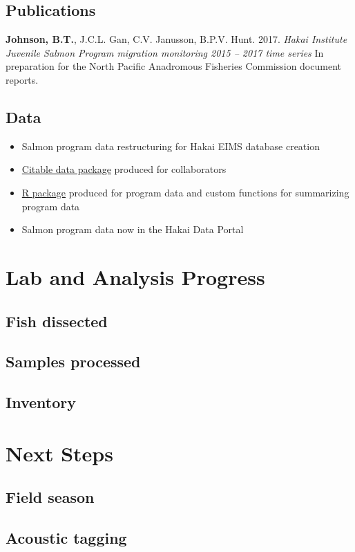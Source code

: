 \documentclass[12pt,]{article}
\providecommand{\tightlist}{%
  \setlength{\itemsep}{0pt}\setlength{\parskip}{0pt}}
\begin{document}
\subsection{Publications}\label{publications}

\textbf{Johnson, B.T.}, J.C.L. Gan, C.V. Janusson, B.P.V. Hunt. 2017.
\emph{Hakai Institute Juvenile Salmon Program migration monitoring 2015
-- 2017 time series} In preparation for the North Pacific Anadromous
Fisheries Commission document reports.

\subsection{Data}\label{data}

\begin{itemize}
\tightlist
\item
  Salmon program data restructuring for Hakai EIMS database creation
\item
  \href{http://dx.doi.org/10.21966/1.566666}{Citable data package}
  produced for collaborators
\item
  \href{https://github.com/HakaiInstitute/hakaisalmon}{R package}
  produced for program data and custom functions for summarizing program
  data
\item
  Salmon program data now in the Hakai Data Portal
\end{itemize}

\section{Lab and Analysis Progress}\label{lab-and-analysis-progress}

\subsection{Fish dissected}\label{fish-dissected}

\subsection{Samples processed}\label{samples-processed}

\subsection{Inventory}\label{inventory}

\section{Next Steps}\label{next-steps}

\subsection{Field season}\label{field-season}

\subsection{Acoustic tagging}\label{acoustic-tagging}
\end{document}
